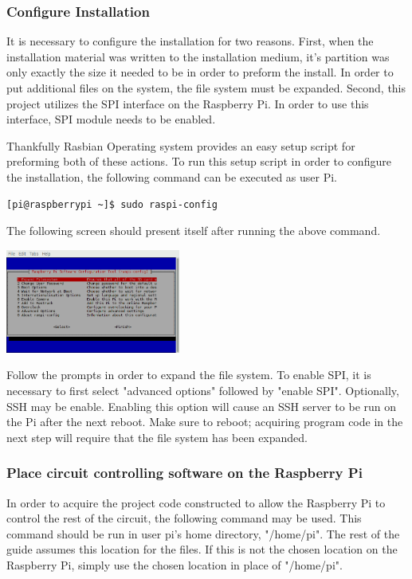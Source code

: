 \documentclass{article}	%
\begin{document}
\begin{multicols}{2}
\subsubsection{Configure Installation}
It is necessary to configure the installation
for two reasons.
First, when the installation material was
written to the installation medium,
it's partition was only exactly the size it needed to be in order to 
preform the install.
In order to put additional files on the system,
the file system must be expanded.
Second, this project utilizes the SPI interface
on the Raspberry Pi.
In order to use this interface,
SPI module needs to be enabled.

Thankfully Rasbian Operating system
provides an easy setup script for preforming 
both of these actions.
To run this setup script in order to configure the
installation,
the following command can be executed as user Pi.

\begin{lstlisting}
[pi@raspberrypi ~]$ sudo raspi-config
\end{lstlisting}

The following screen should present itself
after running the above command.

\begin{center}
\includegraphics[width=0.43\textwidth,keepaspectratio]{raspi_config.png}
\end{center}

Follow the prompts in order to expand the file system.
To enable SPI, it is necessary to first
select "advanced options" followed by "enable SPI".
Optionally, SSH may be enable.
Enabling this option will cause an SSH server
to be run on the Pi after the next reboot. 
Make sure to reboot;
acquiring program code in the next step will require
that the file system has been expanded.

\subsubsection{Place circuit controlling software on the Raspberry Pi}
In order to acquire the project code constructed to 
allow the Raspberry Pi to control the rest of the circuit,
the following command may be used.
This command should be run in user pi's home directory, "/home/pi".
The rest of the guide assumes this location for the files.
If this is not the chosen location on the
Raspberry Pi,
simply use the chosen location in place of "/home/pi".


\end{multicols}
\end{document}
